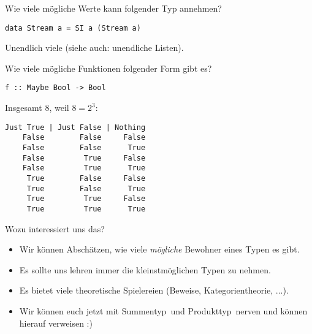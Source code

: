 \documentclass{beamer}
\begin{document}
\begin{frame}[fragile]
Wie viele mögliche Werte kann folgender Typ annehmen?
\begin{verbatim}
data Stream a = SI a (Stream a)
\end{verbatim}
\pause
\bigskip

Unendlich viele (siehe auch: unendliche Listen).
\end{frame}

\begin{frame}[fragile]
Wie viele mögliche Funktionen folgender Form gibt es?
\begin{verbatim}
f :: Maybe Bool -> Bool
\end{verbatim}
\pause
\bigskip

Insgesamt 8, weil $8 = 2^3$:
\begin{verbatim}
Just True | Just False | Nothing
    False        False     False
    False        False      True
    False         True     False
    False         True      True
     True        False     False
     True        False      True
     True         True     False
     True         True      True
\end{verbatim}
\end{frame}

\begin{frame}[fragile]
Wozu interessiert uns das?
\pause
\begin{itemize}
 \item Wir können Abschätzen, wie viele \textit{mögliche} Bewohner eines Typen es gibt. \pause
 \item Es sollte uns lehren immer die kleinstmöglichen Typen zu nehmen. \pause
 \item Es bietet viele theoretische Spielereien (Beweise, Kategorientheorie, ...). \pause
 \item Wir können euch jetzt mit \glqq Summentyp\grqq \ und \glqq Produkttyp\grqq\ nerven und können hierauf verweisen :)
\end{itemize}

\end{frame}

\end{document}

